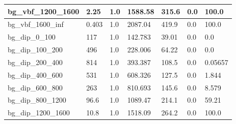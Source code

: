 \documentclass[a4paper, 10pt]{article}
\begin{document}
\begin{table}[H]
\begin{center}
\begin{tabular}{|m{23.0mm}|m{23.0mm}|m{18.0mm}|m{19.0mm}|m{19.0mm}|m{19.0mm}|m{19.0mm}|}
      \hline
      {\cellcolor{white}         bg\_vbf\_1200\_1600}& {\cellcolor{white}         2.25}& {\cellcolor{white}         1.0}& {\cellcolor{white}         1588.58}& {\cellcolor{white}         315.6}& {\cellcolor{red}         0.0}& {\cellcolor{red}         100.0}\\
      \hline
      {\cellcolor{white}         bg\_vbf\_1600\_inf}& {\cellcolor{white}         0.403}& {\cellcolor{white}         1.0}& {\cellcolor{white}         2087.04}& {\cellcolor{white}         419.9}& {\cellcolor{red}         0.0}& {\cellcolor{red}         100.0}\\
      \hline
      {\cellcolor{white}         bg\_dip\_0\_100}& {\cellcolor{white}         117}& {\cellcolor{white}         1.0}& {\cellcolor{white}         142.783}& {\cellcolor{white}         39.01}& {\cellcolor{green}         0.0}& {\cellcolor{green}         0.0}\\
      \hline
      {\cellcolor{white}         bg\_dip\_100\_200}& {\cellcolor{white}         496}& {\cellcolor{white}         1.0}& {\cellcolor{white}         228.006}& {\cellcolor{white}         64.22}& {\cellcolor{green}         0.0}& {\cellcolor{green}         0.0}\\
      \hline
      {\cellcolor{white}         bg\_dip\_200\_400}& {\cellcolor{white}         814}& {\cellcolor{white}         1.0}& {\cellcolor{white}         393.387}& {\cellcolor{white}         108.5}& {\cellcolor{green}         0.0}& {\cellcolor{green}         0.05657}\\
      \hline
      {\cellcolor{white}         bg\_dip\_400\_600}& {\cellcolor{white}         531}& {\cellcolor{white}         1.0}& {\cellcolor{white}         608.326}& {\cellcolor{white}         127.5}& {\cellcolor{green}         0.0}& {\cellcolor{green}         1.844}\\
      \hline
      {\cellcolor{white}         bg\_dip\_600\_800}& {\cellcolor{white}         263}& {\cellcolor{white}         1.0}& {\cellcolor{white}         810.693}& {\cellcolor{white}         145.6}& {\cellcolor{orange}         0.0}& {\cellcolor{orange}         8.579}\\
      \hline
      {\cellcolor{white}         bg\_dip\_800\_1200}& {\cellcolor{white}         96.6}& {\cellcolor{white}         1.0}& {\cellcolor{white}         1089.47}& {\cellcolor{white}         214.1}& {\cellcolor{red}         0.0}& {\cellcolor{red}         59.21}\\
      \hline
      {\cellcolor{white}         bg\_dip\_1200\_1600}& {\cellcolor{white}         10.8}& {\cellcolor{white}         1.0}& {\cellcolor{white}         1518.09}& {\cellcolor{white}         264.2}& {\cellcolor{red}         0.0}& {\cellcolor{red}         100.0}\\

\end{tabular}
\end{center}
\end{table}
\end{document}
